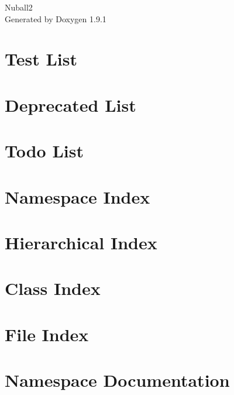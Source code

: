 \let\mypdfximage\pdfximage\def\pdfximage{\immediate\mypdfximage}\documentclass[twoside]{book}
\newcommand{\+}{\discretionary{\mbox{\scriptsize$\hookleftarrow$}}{}{}}
\newcommand{\clearemptydoublepage}{%
  \newpage{\pagestyle{empty}\cleardoublepage}%
}
\begin{document}
\raggedbottom

\begin{titlepage}
\vspace*{7cm}
\begin{center}%
{\Large Nuball2 }\\
\vspace*{1cm}
{\large Generated by Doxygen 1.9.1}\\
\end{center}
\end{titlepage}
\clearemptydoublepage
{}
\tableofcontents
\clearemptydoublepage
{}

\chapter{Test List}
\label{test}

\chapter{Deprecated List}
\label{deprecated}

\chapter{Todo List}
\label{todo}

\chapter{Namespace Index}

\chapter{Hierarchical Index}

\chapter{Class Index}

\chapter{File Index}

\chapter{Namespace Documentation}

\end{document}
